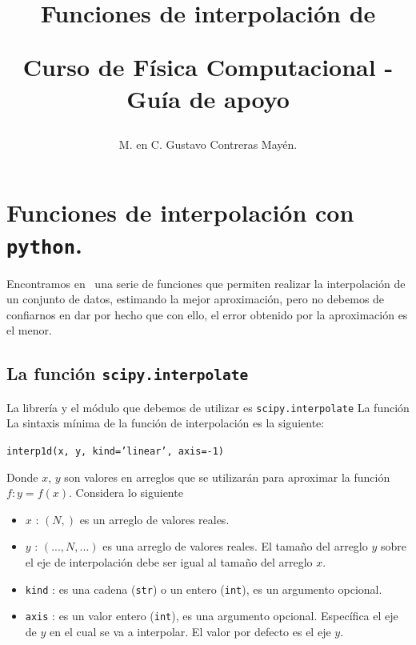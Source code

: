 

\title{Funciones de interpolación de \python \\ \begin{Large}Curso de Física Computacional - Guía de apoyo \end{Large}}
\author{M. en C. Gustavo Contreras Mayén.}
%

\maketitle
\fontsize{14}{14}\selectfont
\section{Funciones de interpolación con \texttt{python}.}
Encontramos en \python\ una serie de funciones que permiten realizar la interpolación de un conjunto de datos, estimando la mejor aproximación, pero no debemos de confiarnos en dar por hecho que con ello, el error obtenido por la aproximación es el menor.
\subsection{La función \texttt{scipy.interpolate}}
La librería y el módulo que debemos de utilizar es \texttt{scipy.interpolate}
La función 
La sintaxis mínima de la función de interpolación es la siguiente:
\par
\texttt{interp1d(x, y, kind='linear', axis=-1)}
\par
Donde $x$, $y$ son valores en arreglos que se utilizarán para aproximar la función $f: y = f(x)$. Considera lo siguiente
\begin{itemize}
\item $x$ : $(N,)$ es un arreglo de valores reales.
\item $y$ : $(...,N,...)$ es una arreglo de valores reales. El tamaño del arreglo $y$ sobre el eje de interpolación debe ser igual al tamaño del arreglo $x$.
\item \texttt{kind} : es una cadena (\texttt{str}) o un entero (\texttt{int}), es un argumento opcional.
\item \texttt{axis} : es un valor entero (\texttt{int}), es una argumento opcional. Específica el eje de $y$ en el cual se va a interpolar. El valor por defecto es el eje $y$.
\end{itemize}
